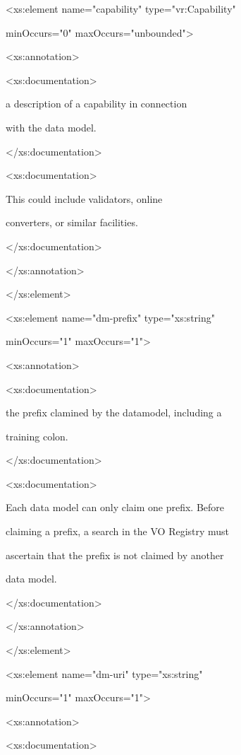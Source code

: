 \documentclass[10pt,a4paper]{ivoa}
\begin{document}
\textless xs:element name="capability" type="vr:Capability"

minOccurs="0" maxOccurs="unbounded"\textgreater{}

\textless xs:annotation\textgreater{}

\textless xs:documentation\textgreater{}

a description of a capability in connection

with the data model.

\textless/xs:documentation\textgreater{}

\textless xs:documentation\textgreater{}

This could include validators, online

converters, or similar facilities.

\textless/xs:documentation\textgreater{}

\textless/xs:annotation\textgreater{}

\textless/xs:element\textgreater{}

\textless xs:element name="dm-prefix" type="xs:string"

minOccurs="1" maxOccurs="1"\textgreater{}

\textless xs:annotation\textgreater{}

\textless xs:documentation\textgreater{}

the prefix clamined by the datamodel, including a

training colon.

\textless/xs:documentation\textgreater{}

\textless xs:documentation\textgreater{}

Each data model can only claim one prefix. Before

claiming a prefix, a search in the VO Registry must

ascertain that the prefix is not claimed by another

data model.

\textless/xs:documentation\textgreater{}

\textless/xs:annotation\textgreater{}

\textless/xs:element\textgreater{}

\textless xs:element name="dm-uri" type="xs:string"

minOccurs="1" maxOccurs="1"\textgreater{}

\textless xs:annotation\textgreater{}

\textless xs:documentation\textgreater{}
\end{document}
